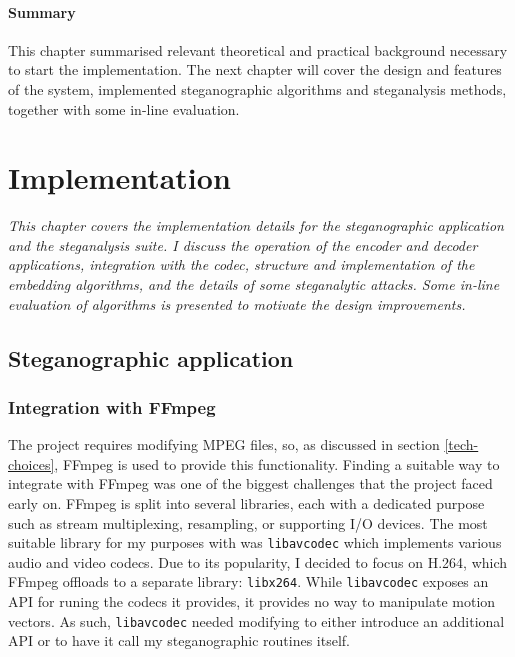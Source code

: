 \documentclass[12pt,british,twoside,notitlepage,usenames,dvipsnames,hypens,final]{report}
\numberwithin{equation}{section}
\numberwithin{figure}{section}
\begin{document}
\bigskip\bigskip
\subsubsection*{Summary}
This chapter summarised relevant theoretical and practical background necessary to start the implementation. The next chapter will cover the design and features of the system, implemented steganographic algorithms and steganalysis methods, together with some in-line evaluation.

\cleardoublepage
\chapter{Implementation}

\textit{This chapter covers the implementation details for the steganographic application and the steganalysis suite. I discuss the operation of the encoder and decoder applications, integration with the codec, structure and implementation of the embedding algorithms, and the details of some steganalytic attacks. Some in-line evaluation of algorithms is presented to motivate the design improvements.}

\section{Steganographic application}

\subsection{Integration with FFmpeg}
\label{integrate-ffmpeg}

The project requires modifying MPEG files, so, as discussed in section \ref{tech-choices}, FFmpeg is used to provide this functionality. Finding a suitable way to integrate with FFmpeg was one of the biggest challenges that the project faced early on. FFmpeg is split into several libraries, each with a dedicated purpose such as stream multiplexing, resampling, or supporting I/O devices. The most suitable library for my purposes with was \texttt{libavcodec} which implements various audio and video codecs. Due to its popularity, I decided to focus on H.264, which FFmpeg offloads to a separate library: \texttt{libx264}. While \texttt{libavcodec} exposes an API for runing the codecs it provides, it provides no way to manipulate motion vectors. As such, \texttt{libavcodec} needed modifying to either introduce an additional API or to have it call my steganographic routines itself.
\end{document}
